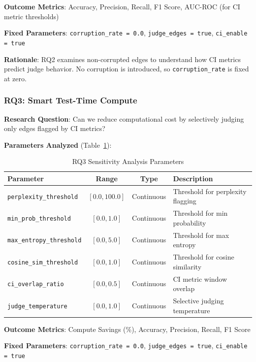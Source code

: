 \textbf{Outcome Metrics}: Accuracy, Precision, Recall, F1 Score, AUC-ROC (for CI metric thresholds)

\textbf{Fixed Parameters}: \texttt{corruption\_rate = 0.0}, \texttt{judge\_edges = true}, \texttt{ci\_enable = true}

\textbf{Rationale}: RQ2 examines non-corrupted edges to understand how CI metrics predict judge behavior. No corruption is introduced, so \texttt{corruption\_rate} is fixed at zero.

\subsubsection{RQ3: Smart Test-Time Compute}

\textbf{Research Question}: Can we reduce computational cost by selectively judging only edges flagged by CI metrics?

\textbf{Parameters Analyzed} (Table~\ref{tab:rq3_params}):

\begin{table}[htbp]
\centering
\caption{RQ3 Sensitivity Analysis Parameters}
\label{tab:rq3_params}
\begin{tabular}{lccl}
\toprule
\textbf{Parameter} & \textbf{Range} & \textbf{Type} & \textbf{Description} \\
\midrule
\texttt{perplexity\_threshold} & $[0.0, 100.0]$ & Continuous & Threshold for perplexity flagging \\
\texttt{min\_prob\_threshold} & $[0.0, 1.0]$ & Continuous & Threshold for min probability \\
\texttt{max\_entropy\_threshold} & $[0.0, 5.0]$ & Continuous & Threshold for max entropy \\
\texttt{cosine\_sim\_threshold} & $[0.0, 1.0]$ & Continuous & Threshold for cosine similarity \\
\texttt{ci\_overlap\_ratio} & $[0.0, 0.5]$ & Continuous & CI metric window overlap \\
\texttt{judge\_temperature} & $[0.0, 1.0]$ & Continuous & Selective judging temperature \\
\bottomrule
\end{tabular}
\end{table}

\textbf{Outcome Metrics}: Compute Savings (\%), Accuracy, Precision, Recall, F1 Score

\textbf{Fixed Parameters}: \texttt{corruption\_rate = 0.0}, \texttt{judge\_edges = true}, \texttt{ci\_enable = true}

